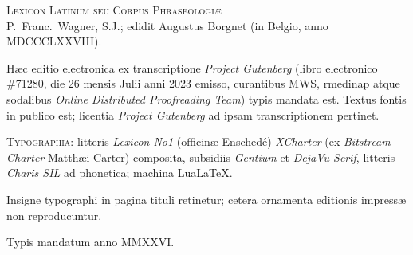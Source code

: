 \thispagestyle{empty}
\vspace*{\fill}
\begin{flushleft}
\footnotesize
{\scshape Lexicon Latinum seu Corpus Phraseologiæ} \\
P.~Franc.~Wagner, S.J.; edidit Augustus Borgnet (in Belgio, anno MDCCCLXXVIII).\par\vspace{1em}
Hæc editio electronica ex transcriptione \textit{Project Gutenberg}
(libro electronico \#71280, die 26 mensis Julii anni 2023 emisso,
curantibus MWS, rmedinap atque sodalibus \textit{Online Distributed
Proofreading Team}) typis mandata est. Textus fontis in publico est;
licentia \textit{Project Gutenberg} ad ipsam transcriptionem
pertinet.\par\vspace{1em}
{\scshape Typographia:} litteris
\ifnum{} \textit{Lexicon No1} (officinæ Enschedé)\else
\textit{XCharter} (ex \textit{Bitstream Charter} Matthæi Carter)\fi{}
composita, subsidiis \textit{Gentium} et \textit{DejaVu Serif},
litteris \textit{Charis SIL} ad phonetica; machina LuaLaTeX.\par\vspace{1em}
Insigne typographi in pagina tituli retinetur; cetera ornamenta
editionis impressæ non reproducuntur.\par\vspace{1em}
Typis mandatum anno MMXXVI.
\end{flushleft}
